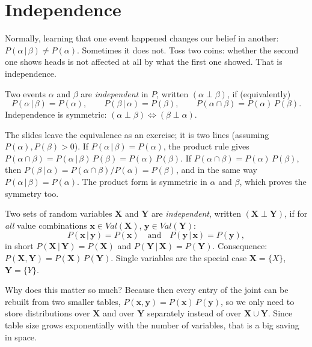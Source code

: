 \documentclass[11pt, oneside]{book}
\newcommand{\Prob}{\mathbb{P}}           %
\newcommand{\given}{\,\vert\,}           %
\newcommand{\Val}{\mathit{Val}}          %
\newcommand{\indep}{\perp}               %
\newcommand{\bX}{\mathbf{X}}  \newcommand{\bY}{\mathbf{Y}}
\newcommand{\bx}{\mathbf{x}}  \newcommand{\by}{\mathbf{y}}
\let\originalsection\section
\renewcommand{\section}{\Needspace{7\baselineskip}\originalsection}
\begin{document}
\section{Independence}
\label{sec:indep}

Normally, learning that one event happened changes our belief in another:
$P(\alpha \given \beta) \neq P(\alpha)$. Sometimes it does not. Toss two coins:
whether the second one shows heads is not affected at all by what the first
one showed. That is independence.

\begin{defbox}[title={Independence of events}]
Two events $\alpha$ and $\beta$ are \emph{independent} in $P$, written
$(\alpha \indep \beta)$, if (equivalently)
\[
P(\alpha \given \beta) = P(\alpha), \qquad
P(\beta \given \alpha) = P(\beta), \qquad
P(\alpha \cap \beta) = P(\alpha)\,P(\beta).
\]
Independence is symmetric: $(\alpha \indep \beta) \Leftrightarrow (\beta \indep
\alpha)$.
\end{defbox}

The slides leave the equivalence as an exercise; it is two lines (assuming
$P(\alpha), P(\beta) > 0$). If $P(\alpha \given \beta) = P(\alpha)$, the
product rule gives $P(\alpha \cap \beta) = P(\alpha \given \beta)\,P(\beta) =
P(\alpha)\,P(\beta)$. If $P(\alpha \cap \beta) = P(\alpha)\,P(\beta)$, then
$P(\beta \given \alpha) = P(\alpha \cap \beta)/P(\alpha) = P(\beta)$, and in
the same way $P(\alpha \given \beta) = P(\alpha)$. The product form is
symmetric in $\alpha$ and $\beta$, which proves the symmetry too.

\begin{defbox}[title={Independence of random variables (and sets of them)}]
Two sets of random variables $\bX$ and $\bY$ are \emph{independent}, written
$(\bX \indep \bY)$, if for \emph{all} value combinations $\bx \in \Val(\bX)$,
$\by \in \Val(\bY)$:
\[
P(\bx \given \by) = P(\bx) \quad\text{and}\quad P(\by \given \bx) = P(\by),
\]
in short $P(\bX \given \bY) = P(\bX)$ and $P(\bY \given \bX) = P(\bY)$.
Consequence: $P(\bX, \bY) = P(\bX)\,P(\bY)$. Single variables are the special
case $\bX = \{X\}$, $\bY = \{Y\}$.
\end{defbox}

Why does this matter so much? Because then every entry of the joint can be
rebuilt from two smaller tables, $P(\bx, \by) = P(\bx)\,P(\by)$, so we only
need to store distributions over $\bX$ and over $\bY$ separately instead of
over $\bX \cup \bY$. Since table size grows exponentially with the number of
variables, that is a big saving in space.
\end{document}
